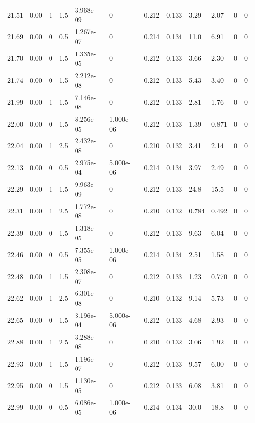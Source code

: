\documentclass[preview]{standalone}
\begin{document}
{{{{{{{{\begin{tabular}{L{1.2cm}C{1.2cm} C{0.3cm}C{0.5cm} C{1.4cm}C{1.4cm} C{1.4cm}C{1.4cm} C{1.6cm}C{1.6cm} C{1.6cm}C{1.6cm}}
  21.51  &  0.00  & 1     & 1.5 &  3.968e-09  & 0  &  0.212&   0.133& 3.29 & 2.07   &  0 & 0  \\ 
  21.69  &  0.00  & 0     & 0.5 &  1.267e-07  & 0  &  0.214&   0.134& 11.0 & 6.91   &  0 & 0  \\ 
  21.70  &  0.00  & 0     & 1.5 &  1.335e-05  & 0  &  0.212&   0.133& 3.66 & 2.30   &  0 & 0  \\ 
  21.74  &  0.00  & 0     & 1.5 &  2.212e-08  & 0  &  0.212&   0.133& 5.43 & 3.40   &  0 & 0  \\ 
  21.99  &  0.00  & 1     & 1.5 &  7.146e-08  & 0  &  0.212&   0.133& 2.81 & 1.76   &  0 & 0  \\ 
  22.00  &  0.00  & 0     & 1.5 &  8.256e-05  & 1.000e-06  &  0.212&   0.133& 1.39 & 0.871   &  0 & 0  \\ 
  22.04  &  0.00  & 1     & 2.5 &  2.432e-08  & 0  &  0.210&   0.132& 3.41 & 2.14   &  0 & 0  \\ 
  22.13  &  0.00  & 0     & 0.5 &  2.975e-04  & 5.000e-06  &  0.214&   0.134& 3.97 & 2.49   &  0 & 0  \\ 
  22.29  &  0.00  & 1     & 1.5 &  9.963e-09  & 0  &  0.212&   0.133& 24.8 & 15.5   &  0 & 0  \\ 
  22.31  &  0.00  & 1     & 2.5 &  1.772e-08  & 0  &  0.210&   0.132& 0.784 & 0.492   &  0 & 0  \\ 
  22.39  &  0.00  & 0     & 1.5 &  1.318e-05  & 0  &  0.212&   0.133& 9.63 & 6.04   &  0 & 0  \\ 
  22.46  &  0.00  & 0     & 0.5 &  7.355e-05  & 1.000e-06  &  0.214&   0.134& 2.51 & 1.58   &  0 & 0  \\ 
  22.48  &  0.00  & 1     & 1.5 &  2.308e-07  & 0  &  0.212&   0.133& 1.23 & 0.770   &  0 & 0  \\ 
  22.62  &  0.00  & 1     & 2.5 &  6.301e-08  & 0  &  0.210&   0.132& 9.14 & 5.73   &  0 & 0  \\ 
  22.65  &  0.00  & 0     & 1.5 &  3.196e-04  & 5.000e-06  &  0.212&   0.133& 4.68 & 2.93   &  0 & 0  \\ 
  22.88  &  0.00  & 1     & 2.5 &  3.288e-08  & 0  &  0.210&   0.132& 3.06 & 1.92   &  0 & 0  \\ 
  22.93  &  0.00  & 1     & 1.5 &  1.196e-07  & 0  &  0.212&   0.133& 9.57 & 6.00   &  0 & 0  \\ 
  22.95  &  0.00  & 0     & 1.5 &  1.130e-05  & 0  &  0.212&   0.133& 6.08 & 3.81   &  0 & 0  \\ 
  22.99  &  0.00  & 0     & 0.5 &  6.086e-05  & 1.000e-06  &  0.214&   0.134& 30.0 & 18.8   &  0 & 0  \\ 

\end{tabular}}}}}}}}}
\end{document}
